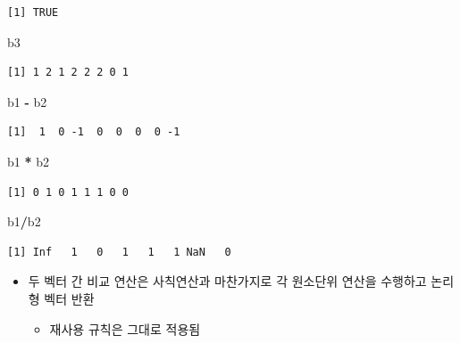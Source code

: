 \documentclass[
  11pt,
]{krantz}
\newenvironment{Shaded}{\begin{snugshade}}{\end{snugshade}}
\newcommand{\NormalTok}[1]{#1}
\newcommand{\OperatorTok}[1]{\textcolor[rgb]{0.43,0.43,0.43}{\textbf{#1}}}
\newcommand{\StringTok}[1]{\textcolor[rgb]{0.5,0.5,0.5}{#1}}
\providecommand{\tightlist}{%
  \setlength{\itemsep}{0pt}\setlength{\parskip}{0pt}}
\begin{document}
\begin{verbatim}
[1] TRUE
\end{verbatim}

\begin{Shaded}
\begin{Highlighting}[]
\NormalTok{b3}
\end{Highlighting}
\end{Shaded}

\begin{verbatim}
[1] 1 2 1 2 2 2 0 1
\end{verbatim}

\begin{Shaded}
\begin{Highlighting}[]
\NormalTok{b1 }\OperatorTok{-}\StringTok{ }\NormalTok{b2}
\end{Highlighting}
\end{Shaded}

\begin{verbatim}
[1]  1  0 -1  0  0  0  0 -1
\end{verbatim}

\begin{Shaded}
\begin{Highlighting}[]
\NormalTok{b1 }\OperatorTok{*}\StringTok{ }\NormalTok{b2}
\end{Highlighting}
\end{Shaded}

\begin{verbatim}
[1] 0 1 0 1 1 1 0 0
\end{verbatim}

\begin{Shaded}
\begin{Highlighting}[]
\NormalTok{b1}\OperatorTok{/}\NormalTok{b2}
\end{Highlighting}
\end{Shaded}

\begin{verbatim}
[1] Inf   1   0   1   1   1 NaN   0
\end{verbatim}

\normalsize

\begin{itemize}
\tightlist
\item
  두 벡터 간 비교 연산은 사칙연산과 마찬가지로 각 원소단위 연산을 수행하고 논리형 벡터 반환

  \begin{itemize}
  \tightlist
  \item
    재사용 규칙은 그대로 적용됨
  \end{itemize}
\end{itemize}
\end{document}
